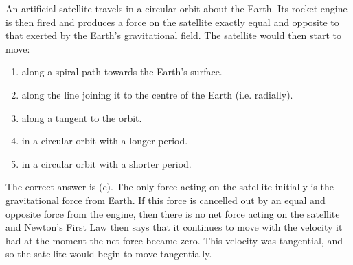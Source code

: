 \begin{problem}[A1988PIQ7l] 
{An artificial satellite travels in a circular orbit about the Earth. Its rocket engine is then fired and produces a force on the satellite exactly equal and opposite to that exerted by the Earth's gravitational field. The satellite would then start to move:
\begin{enumerate}
	\item along a spiral path towards the Earth's surface.
	\item along the line joining it to the centre of the Earth (i.e. radially).
	\item along a tangent to the orbit. \answer
	\item in a circular orbit with a longer period.
	\item in a circular orbit with a shorter period.
\end{enumerate}}
{}
{The correct answer is (c). The only force acting on the satellite initially is the gravitational force from Earth. If this force is cancelled out by an equal and opposite force from the engine, then there is no net force acting on the satellite and Newton's First Law then says that it continues to move with the velocity it had at the moment the net force became zero. This velocity was tangential, and so the satellite would begin to move tangentially.}
\end{problem}

